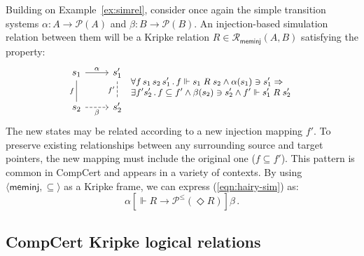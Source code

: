 \documentclass[sigplan,screen,review]{acmart}
\newcommand{\figsize}{\small}
\newcommand{\kw}[1]{\ensuremath{ \mathsf{#1} }}
\newcommand{\ifr}[1]{\mathrel{[{#1}]}}
\begin{document}
\begin{example} \label{ex:sim} %
Building on Example~\ref{ex:simrel},
consider once again the simple transition systems
$\alpha : A \rightarrow \mathcal{P}(A)$ and
$\beta : B \rightarrow \mathcal{P}(B)$.
An injection-based simulation relation between them
will be a Kripke relation
$R \in \mathcal{R}_\kw{meminj}(A, B)$
satisfying the property:
\begin{equation} \label{eqn:hairy-sim}
  \begin{tikzcd}
    s_1 \arrow[r, "\alpha"]
        \arrow[d, dash, "f"'] &
    s_1' \arrow[d, dashed, dash, "f'"'] \\ %
    s_2 \arrow[r, dashed, "\beta"'] &
    s_2'
  \end{tikzcd}
 {\figsize
  \begin{array}{l}
    \forall f \, s_1 \, s_2 \, s_1' \,.\,
      f \Vdash s_1 \mathrel{R} s_2 \wedge
      \alpha(s_1) \ni s_1' \Rightarrow \\
    \exists f' s_2' \,.\,
      f \subseteq f' \wedge
      \beta(s_2) \ni s_2' \wedge
      f' \Vdash s_1' \mathrel{R} s_2'
  \end{array}}
\end{equation}
The new states may be related according to
a new injection mapping $f'$.
To preserve existing relationships
between any surrounding source and target pointers,
the new mapping must include
the original one ($f \subseteq f'$).
This pattern is common in CompCert
and appears in a variety of contexts.
By using $\langle \kw{meminj}, {\subseteq} \rangle$
as a Kripke frame,
we can express
(\ref{eqn:hairy-sim}) as:
\[
  \alpha \ifr{\Vdash R \rightarrow \mathcal{P}^\le(\Diamond R)} \beta \,.
\]
\end{example}


\subsection{CompCert Kripke logical relations} \label{sec:cklrdef} %
\end{document}
